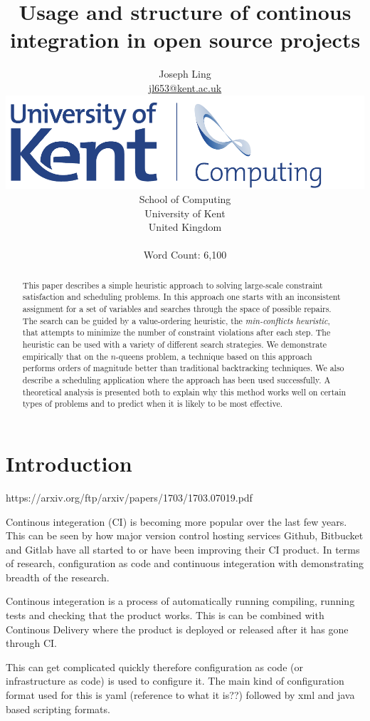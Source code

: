 \documentclass[twoside,12pt,titlepage,a4paper]{article}
\title{Usage and structure of continous integration in open source projects }
\author{Joseph Ling\\\vspace{10mm}
       \url{jl653@kent.ac.uk} \\ \vspace{5mm}
       \includegraphics[scale=0.6]{Kent_Comp_294_RGB} \\
       School of Computing \\
       University of Kent \\
       United Kingdom \\ \vspace{10mm} \\ Word Count: 6,100}
\begin{document}
\maketitle
\restoregeometry              %

\begin{abstract}
This paper describes a simple heuristic approach to solving large-scale
constraint satisfaction and scheduling problems.  In this approach one
starts with an inconsistent assignment for a set of variables and
searches through the space of possible repairs. The search can be guided
by a value-ordering heuristic, the {\em min-conflicts heuristic}, that
attempts to minimize the number of constraint violations after each
step.  The heuristic can be used with a variety of different search
strategies.  We demonstrate empirically that on the $n$-queens problem, 
a technique
based on this approach performs orders of magnitude better than
traditional backtracking techniques.  We also describe a
scheduling application where the approach has been used successfully.  A
theoretical analysis is presented both to explain why this method works
well on certain types of problems and to predict when it is likely to
be most effective.
\end{abstract}

\section{Introduction}
\label{Introduction}

https://arxiv.org/ftp/arxiv/papers/1703/1703.07019.pdf

Continous integeration (CI) is becoming more popular over the last few years. This can be seen by how major version control hosting services Github, Bitbucket and Gitlab have all started to or have been improving their CI product. In terms of research, configuration as code \cite{Rahman2019} and continuous integeration \cite{Copeland2010} with \cite{Shahin2017} demonstrating breadth of the research.

Continous integeration is a process of automatically running compiling, running tests and checking that the product works. This is can be combined with Continous Delivery where the product is deployed or released after it has gone through CI. 

This can get complicated quickly therefore configuration as code (or infrastructure as code) is used to configure it. The main kind of configuration format used for this is yaml (reference to what it is??) followed by xml and java based scripting formats.
\end{document}
